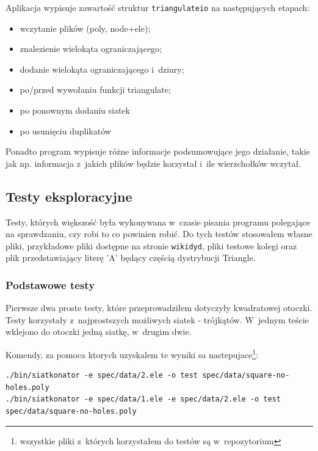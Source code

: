 \documentclass[a4paper]{article} \usepackage{setspace}
\begin{document}
Aplikacja wypisuje zawartość struktur \texttt{triangulateio} na następujących etapach:
\begin{itemize}
  \item wczytanie plików (poly, node+ele);
  \item znalezienie wielokąta ograniczającego;
  \item dodanie wielokąta ograniczającego i~dziury;
  \item po/przed wywołaniu funkcji triangulate;
  \item po ponownym dodaniu siatek
  \item po usunięciu duplikatów
\end{itemize}

Ponadto program wypisuje różne informacje podsumowujące jego działanie, takie jak np. informacja z~jakich plików będzie korzystał i~ile wierzchołków wczytał.

\subsection{Testy eksploracyjne}
Testy, których większość była wykonywana w~czasie pisania programu polegające na sprawdzaniu, czy robi to co powinien robić.
Do tych testów stosowałem własne pliki, przykładowe pliki dostępne na stronie \texttt{wikidyd}, pliki testowe kolegi oraz plik przedstawiający literę 'A' będący częścią dystrybucji Triangle.

\newpage
\subsubsection{Podstawowe testy}
Pierwsze dwa proste testy, które przeprowadziłem dotyczyły kwadratowej otoczki.
Testy korzystały z~najprostszych możliwych siatek - trójkątów.
W~jednym teście wklejono do otoczki jedną siatkę, w~drugim dwie.

Komendy, za pomoca ktorych uzyskalem te wyniki sa nastepujace\footnote{wszystkie pliki z~których korzystałem do testów są w~repozytorium}:
\begin{lstlisting}
./bin/siatkonator -e spec/data/2.ele -o test spec/data/square-no-holes.poly
./bin/siatkonator -e spec/data/1.ele -e spec/data/2.ele -o test spec/data/square-no-holes.poly
\end{lstlisting}
\end{document}
